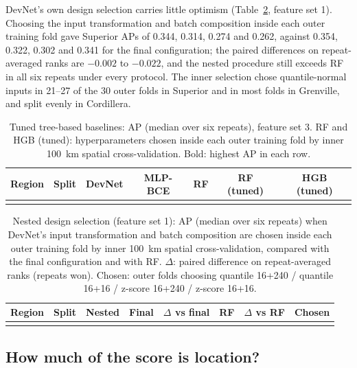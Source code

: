\documentclass[pdflatex,sn-apa]{sn-jnl}
\begin{document}
DevNet's own design selection carries little optimism (Table~\ref{tab:nested}, feature set 1). Choosing the input transformation and batch composition inside each outer training fold gave Superior APs of 0.344, 0.314, 0.274 and 0.262, against 0.354, 0.322, 0.302 and 0.341 for the final configuration; the paired differences on repeat-averaged ranks are $-0.002$ to $-0.022$, and the nested procedure still exceeds RF in all six repeats under every protocol. The inner selection chose quantile-normal inputs in 21--27 of the 30 outer folds in Superior and in most folds in Grenville, and split evenly in Cordillera.

\begin{table}[t]
\caption{Tuned tree-based baselines: AP (median over six repeats), feature set 3. RF and HGB (tuned): hyperparameters chosen inside each outer training fold by inner 100~km spatial cross-validation. Bold: highest AP in each row.}\label{tab:controls}
\footnotesize
\setlength{\tabcolsep}{3pt}
\begin{tabular*}{\textwidth}{@{\extracolsep\fill}llccccc}
\toprule
Region & Split & DevNet & MLP-BCE & RF & RF (tuned) & HGB (tuned) \\
\midrule
\botrule
\end{tabular*}
\end{table}

\begin{table}[t]
\caption{Nested design selection (feature set 1): AP (median over six repeats) when DevNet's input transformation and batch composition are chosen inside each outer training fold by inner 100~km spatial cross-validation, compared with the final configuration and with RF. $\Delta$: paired difference on repeat-averaged ranks (repeats won). Chosen: outer folds choosing quantile 16+240 / quantile 16+16 / z-score 16+240 / z-score 16+16.}\label{tab:nested}
\scriptsize
\setlength{\tabcolsep}{2.5pt}
\begin{tabular*}{\textwidth}{@{\extracolsep\fill}llcccccc}
\toprule
Region & Split & Nested & Final & $\Delta$ vs final & RF & $\Delta$ vs RF & Chosen \\
\midrule
\botrule
\end{tabular*}
\end{table}

\subsection{How much of the score is location?}\label{sec:res-geography}
\end{document}
